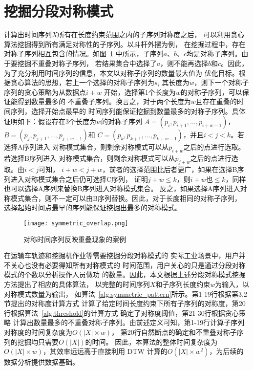 \section{挖掘分段对称模式}

计算出时间序列$X$所有在长度约束范围之内的子序列对称度之后，
可以利用贪心算法挖掘得到所有满足对称性的子序列。以斗杆外摆为例，
在挖掘过程中，存在对称子序列相互包含的情况。如图~\ref{fig:overlap}
中所示，子序列$a$、$b$、$c$均是对称子序列。由于要挖掘不重叠对称子序列，
若结果集合中选择了$a$，则不能再选择$b$和$c$。因此，
为了充分利用时间序列的信息，本文以对称子序列的数量最大值为
优化目标。根据贪心算法的思想，若上一个选择的对称子序列为$s_i$
其长度为$w$，则下一个对称子序列的贪心策略为从数据点$i+w$
开始，选择第1个长度为$w$的对称子序列，可以保证能得到数量最多的
不重叠子序列。换言之，对于两个长度为$w$且存在重叠的时间序列，选择开始点最早的
时间序列能保证挖掘到数量最多的对称子序列。具体证明如下：假设存在3个长度为$w$的对称子序列
$A=\left(p_{i}, p_{i+1}, \dots, p_{i+w-1}\right)$，$B=\left(p_{j}, p_{j+1}, \dots, p_{j+w-1}\right)$和
$C=\left(p_{k}, p_{k+1}, \dots, p_{k+w-1}\right)$，并且$i<j<k$。若选择A序列进入
对称模式集合，则剩余对称模式可以从$p_{i+w}$之后的点进行选取。若选择B序列进入
对称模式集合，则剩余对称模式可以从$p_{j+w}$之后的点进行选取。由$i<j$可知，
$i+w<j+w$，前者的选择范围比后者更广，如果在选择B序列进入对称模式集合之后仍可选择C序列，
证明$j+w \leq k$，则$i+w$也$\leq k$，同样也可以选择A序列来替换B序列进入对称模式集合。
反之，如果选择A序列进入对称模式集合，则不一定可以由B序列替换。因此，对于长度相同的对称子序列，
选择起始时间点最早的序列能保证挖掘出最多的对称模式。

\begin{figure}
  \centering
  \texttt{[image: symmetric\_overlap.png]}
  \caption{对称时间序列反映重叠现象的案例}
  \label{fig:overlap}
\end{figure}

在运输车轨迹和挖掘机作业等需要挖掘分段对称模式的
实际工业场景中，用户并不关心也没有必要得知所有对称模式的
时间范围，用户关心的只是通过分段对称模式的个数以分析操作人员做功
的数量。因此，本文根据上述分段对称模式挖掘方法提出了相应的具体算法，
以完整的时间序列$X$和子序列长度约束$w$为输入，以对称模式数量为输出，
如算法~\ref{alg:symmetric_pattern}所示。第1-19行根据第3.2节提出的对称度计算方式
计算了给定时间长度约束下所有子序列的对称度，第20行根据算法~\ref{alg:threshold}的计算方式
确定了对称度阈值，第21-30行根据贪心策略
计算出数量最多的不重叠对称子序列。由前述定义可知，第1-19行计算子序列对称度的时间复杂度为$O(|X| \times w)$，
第20行自然断点的确定和不重叠对称子序列的挖掘均只需要$O(|X|)$的时间。
因此，本算法的整体时间复杂度为$O(|X| \times w)$，其效率远远高于直接利用
DTW 计算的$O\left(|X| \times w^{2}\right)$，为后续的数据分析提供数据基础。
\renewcommand{\algorithmicrequire}{\textbf{输入：}\unskip}
\renewcommand{\algorithmicensure}{\textbf{输出：}\unskip}

